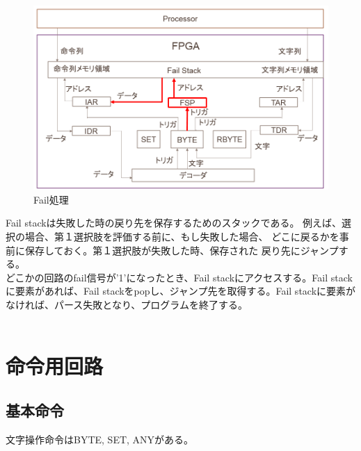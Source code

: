 \documentclass[12pt,oneside]{report}
\begin{document}
\begin{figure}[t]
    \begin{center}
        \includegraphics[width=130mm]{./fig/fail.png}
       \caption{Fail処理}
        \label{fig:fail}
    \end{center}
\end{figure}


Fail stackは失敗した時の戻り先を保存するためのスタックである。
例えば、選択の場合、第１選択肢を評価する前に、もし失敗した場合、
どこに戻るかを事前に保存しておく。第１選択肢が失敗した時、保存された
戻り先にジャンプする。\\
どこかの回路のfail信号が'1'になったとき、Fail stackにアクセスする。Fail stackに要素があれば、Fail stackをpopし、ジャンプ先を取得する。Fail stackに要素がなければ、パース失敗となり、プログラムを終了する。\\
\\



\section{命令用回路}

\subsection{基本命令}
文字操作命令はBYTE, SET, ANYがある。
\end{document}
